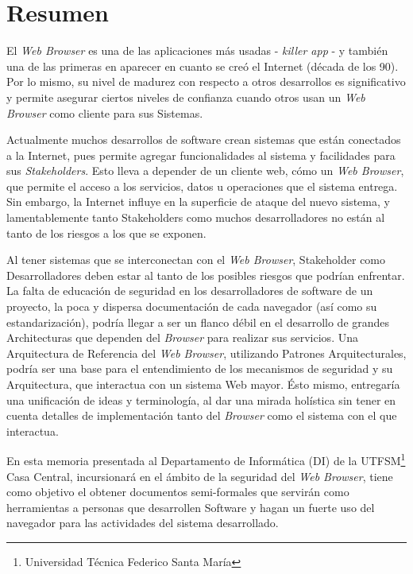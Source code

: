 
\section*{Resumen}
\label{chap:resumen}

El \textit{Web Browser} es una de las aplicaciones más usadas - \textit{killer app} - y también una de las primeras en aparecer en cuanto se creó el Internet (década de los 90). Por lo mismo, su nivel de madurez con respecto a otros desarrollos es significativo y permite asegurar ciertos niveles de confianza cuando otros usan un \textit{Web Browser} como cliente para sus Sistemas. 

Actualmente muchos desarrollos de software crean sistemas que están conectados a la Internet, pues permite agregar funcionalidades al sistema y facilidades para sus \textit{Stakeholders}. Esto lleva a depender de un cliente web, cómo un \textit{Web Browser}, que permite el acceso a los servicios, datos u operaciones que el sistema entrega. Sin embargo, la Internet influye en la superficie de ataque del nuevo sistema, y lamentablemente tanto Stakeholders como muchos desarrolladores no están al tanto de los riesgos a los que se exponen.

Al tener sistemas que se interconectan con el \textit{Web Browser}, Stakeholder como Desarrolladores deben estar al tanto de los posibles riesgos que podrían enfrentar. La falta de educación de seguridad en los desarrolladores de software de un proyecto, la poca y dispersa documentación de cada navegador (así como su estandarización), podría llegar a ser un flanco débil en el desarrollo de grandes Architecturas que dependen del \textit{Browser} para realizar sus servicios. Una Arquitectura de Referencia del \textit{Web Browser}, utilizando Patrones Arquitecturales, podría ser una base para el entendimiento de los mecanismos de seguridad y su Arquitectura, que interactua con un sistema Web mayor. Ésto mismo, entregaría una unificación de ideas y terminología, al dar una mirada holística sin tener en cuenta detalles de implementación tanto del \textit{Browser} como el sistema con el que interactua.

En esta memoria presentada al Departamento de Informática (DI) de la UTFSM\footnote{Universidad Técnica Federico Santa María} Casa Central, incursionará en el ámbito de la seguridad del \textit{Web Browser}, tiene como objetivo el obtener documentos semi-formales que servirán como herramientas a personas que desarrollen Software y hagan un fuerte uso del navegador para las actividades del sistema desarrollado.

